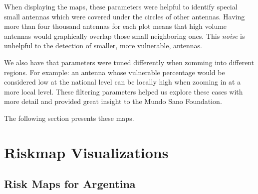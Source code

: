 When displaying the maps, these parameters were helpful to identify special small antennas which were covered under the circles of other antennas. Having more than four thousand antennas for each plot means that high volume antennas would graphically overlap those small neighboring ones. This \textit{noise} is unhelpful to the detection of smaller, more vulnerable, antennas.

We also have that parameters were tuned differently when zomming into different regions. For example: an antenna whose vulnerable percentage would be considered low at the national level can be locally high when zooming in at a more local level. These filtering parameters helped us explore these cases with more detail and provided great insight to the Mundo Sano Foundation.

The following section presents these maps.

\section{Riskmap Visualizations}\label{section:riskmaps}

\subsection{Risk Maps for Argentina}


